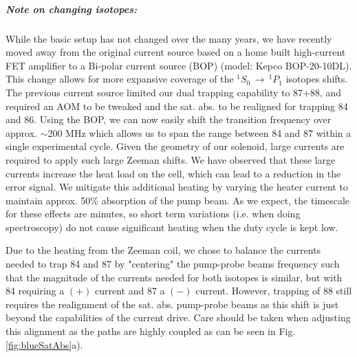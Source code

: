 \subparagraph{Note on changing isotopes:} \label{para:change_iso}
While the basic setup has not changed over the many years, we have recently moved away from the original current source based on a home built high-current FET amplifier to a Bi-polar current source (BOP) (model: Kepco BOP-20-10DL).
This change allows for more expansive coverage of the $^1S_0\,\rightarrow\,^1P_1$ isotopes shifts. The previous current source limited our dual trapping capability to 87+88, and required an AOM to be tweaked and the sat. abs. to be realigned for trapping 84 and 86. 
Using the BOP, we can now easily shift the transition frequency over approx. $\sim$200 MHz which allows us to span the range between 84 and 87 within a single experimental cycle.
Given the geometry of our solenoid, large currents are required to apply such large Zeeman shifts.
We have observed that these large currents increase the heat load on the cell, which can lead to a reduction in the error signal.
We mitigate this additional heating by varying the heater current to maintain approx. 50\% absorption of the pump beam.
As we expect, the timescale for these effects are minutes, so short term variations (i.e. when doing spectroscopy) do not cause significant heating when the duty cycle is kept low.

Due to the heating from the Zeeman coil, we chose to balance the currents needed to trap 84 and 87 by "centering" the pump-probe beams frequency such that the magnitude of the currents needed for both isotopes is similar, but with 84 requiring a $(+)$ current and 87 a $(-)$ current.
However, trapping of 88 still requires the realignment of the sat. abs. pump-probe beams as this shift is just beyond the capabilities of the current drive. 
Care should be taken when adjusting this alignment as the paths are highly coupled as can be seen in Fig.\,\ref{fig:blueSatAbs}a).

%
%
%
%	
%		

